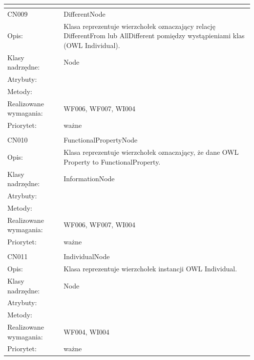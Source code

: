 \begin{center}
\begin{longtable}{|m{3cm}|m{9cm}|}
\multicolumn{2}{c}{} \\
 \hline

CN009 & DifferentNode \\ \hline
Opis: & Klasa reprezentuje wierzchołek oznaczający relację DifferentFrom lub AllDifferent pomiędzy wystąpieniami klas (OWL Individual).    \\ \hline
Klasy nadrzędne: & Node     \\ \hline
Atrybuty: & %
 \\ \hline
Metody: & %
  \\ \hline
Realizowane wymagania: & WF006, WF007, WI004 \\ \hline
Priorytet: & ważne  \\ \hline

\multicolumn{2}{c}{} \\
 \hline

CN010 & FunctionalPropertyNode \\ \hline
Opis: & Klasa reprezentuje wierzchołek oznaczający, że dane OWL Property to FunctionalProperty.  \\ \hline
Klasy nadrzędne: & InformationNode     \\ \hline
Atrybuty: & %
 \\ \hline
Metody: & %
  \\ \hline
Realizowane wymagania: & WF006, WF007, WI004 \\ \hline
Priorytet: & ważne  \\ \hline

\multicolumn{2}{c}{} \\
 \hline

CN011 & IndividualNode \\ \hline
Opis: & Klasa reprezentuje wierzchołek instancji OWL Individual.  \\ \hline
Klasy nadrzędne: & Node     \\ \hline
Atrybuty: & %
 \\ \hline
Metody: & %
  \\ \hline
Realizowane wymagania: & WF004, WI004 \\ \hline
Priorytet: & ważne  \\ \hline


\end{longtable}
\end{center}
